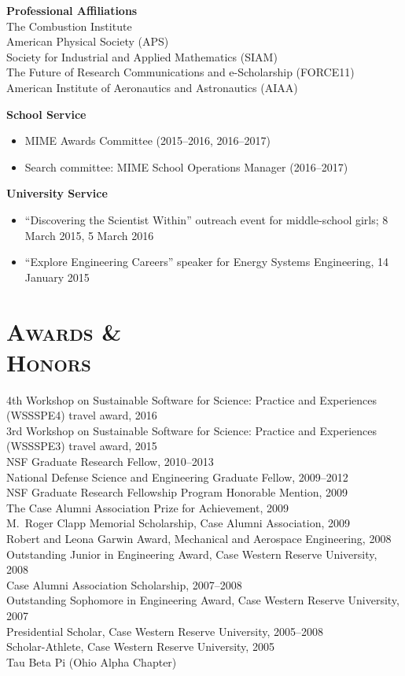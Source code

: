 \documentclass[margin,line,11pt]{res}
\begin{document}
\begin{resume}
\textbf{Professional Affiliations} \\
The Combustion Institute \\
American Physical Society (APS) \\
Society for Industrial and Applied Mathematics (SIAM) \\
The Future of Research Communications and e-Scholarship (FORCE11) \\
American Institute of Aeronautics and Astronautics (AIAA)

\textbf{School Service}
\begin{itemize}[leftmargin=*]
    \item MIME Awards Committee (2015--2016, 2016--2017)
    \item Search committee: MIME School Operations Manager (2016--2017)
\end{itemize}

\textbf{University Service}
\begin{itemize}[leftmargin=*]
\item ``Discovering the Scientist Within'' outreach event for middle-school girls; 8 March 2015, 5 March 2016
\item ``Explore Engineering Careers'' speaker for Energy Systems Engineering, 14 January 2015
\end{itemize}

\section{\textsc{Awards \& \\Honors}}
4th Workshop on Sustainable Software for Science: Practice and Experiences (WSSSPE4) travel award, 2016 \\
3rd Workshop on Sustainable Software for Science: Practice and Experiences (WSSSPE3) travel award, 2015 \\
NSF Graduate Research Fellow, 2010--2013 \\
National Defense Science and Engineering Graduate Fellow, 2009--2012 \\
NSF Graduate Research Fellowship Program Honorable Mention, 2009 \\
The Case Alumni Association Prize for Achievement, 2009 \\
M.\ Roger Clapp Memorial Scholarship, Case Alumni Association, 2009 \\
Robert and Leona Garwin Award, Mechanical and Aerospace Engineering, 2008 \\
Outstanding Junior in Engineering Award, Case Western Reserve University, 2008 \\
Case Alumni Association Scholarship, 2007--2008 \\
Outstanding Sophomore in Engineering Award, Case Western Reserve University, 2007 \\
Presidential Scholar, Case Western Reserve University, 2005--2008 \\
Scholar-Athlete, Case Western Reserve University, 2005 \\
Tau Beta Pi (Ohio Alpha Chapter)


\end{resume}
\end{document}
